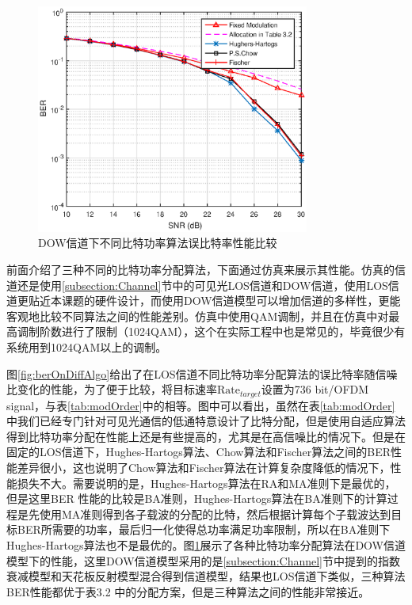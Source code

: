 \begin{figure}[htbp]
\centering
\includegraphics[width=0.8\textwidth]{figures/chapter-4/DOWBERonDiffAlgo.eps}
\caption{DOW信道下不同比特功率算法误比特率性能比较}
\label{fig:DOWBERonDiffAlgo}
\end{figure}
前面介绍了三种不同的比特功率分配算法，下面通过仿真来展示其性能。仿真的信道还是使用\ref{subsection:Channel}节中的可见光LOS信道和DOW信道，使用LOS信道更贴近本课题的硬件设计，而使用DOW信道模型可以增加信道的多样性，更能客观地比较不同算法之间的性能差别。仿真中使用QAM调制，并且在仿真中对最高调制阶数进行了限制（1024QAM），这个在实际工程中也是常见的，毕竟很少有系统用到1024QAM以上的调制。

图\ref{fig:berOnDiffAlgo}给出了在LOS信道不同比特功率分配算法的误比特率随信噪比变化的性能，为了便于比较，将目标速率$\text{Rate}_{target}$设置为736 bit/OFDM signal，与表\ref{tab:modOrder}中的相等。图中可以看出，虽然在表\ref{tab:modOrder}中我们已经专门针对可见光通信的低通特意设计了比特分配，但是使用自适应算法得到比特功率分配在性能上还是有些提高的，尤其是在高信噪比的情况下。但是在固定的LOS信道下，Hughes-Hartogs算法、Chow算法和Fischer算法之间的BER性能差异很小，这也说明了Chow算法和Fischer算法在计算复杂度降低的情况下，性能损失不大。需要说明的是，Hughes-Hartogs算法在RA和MA准则下是最优的，但是这里BER 性能的比较是BA准则，Hughes-Hartogs算法在BA准则下的计算过程是先使用MA准则得到各子载波的分配的比特，然后根据计算每个子载波达到目标BER所需要的功率，最后归一化使得总功率满足功率限制，所以在BA准则下Hughes-Hartogs算法也不是最优的。图\ref{fig:DOWBERonDiffAlgo}展示了各种比特功率分配算法在DOW信道模型下的性能，这里DOW信道模型采用的是\ref{subsection:Channel}节中提到的指数衰减模型和天花板反射模型混合得到信道模型，结果也LOS信道下类似，三种算法BER性能都优于表3.2 中的分配方案，但是三种算法之间的性能非常接近。

